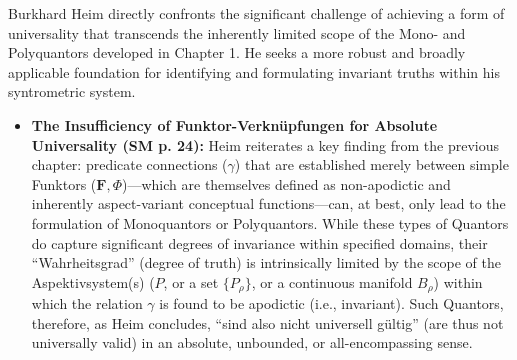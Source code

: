 \documentclass[12pt]{article}
\newcommand{\q}[1]{\enquote{#1}}
\newcommand{\aspektivsystem}{P}
\newcommand{\funktor}{\bm{F}}
\begin{document}
Burkhard Heim directly confronts the significant challenge of achieving a form of universality that transcends the inherently limited scope of the Mono- and Polyquantors developed in Chapter 1. He seeks a more robust and broadly applicable foundation for identifying and formulating invariant truths within his syntrometric system.

\begin{itemize}
    \item \textbf{The Insufficiency of Funktor-Verknüpfungen for Absolute Universality (SM p. 24):}
    Heim reiterates a key finding from the previous chapter: predicate connections (\(\gamma\)) that are established merely between simple Funktors (\(\funktor, \Phi\))—which are themselves defined as non-apodictic and inherently aspect-variant conceptual functions—can, at best, only lead to the formulation of Monoquantors or Polyquantors. While these types of Quantors do capture significant degrees of invariance within specified domains, their \q{Wahrheitsgrad} (degree of truth) is intrinsically limited by the scope of the Aspektivsystem(s) (\(\aspektivsystem\), or a set \(\{\aspektivsystem_\rho\}\), or a continuous manifold \(B_\rho\)) within which the relation \( \gamma \) is found to be apodictic (i.e., invariant). Such Quantors, therefore, as Heim concludes, \q{sind also nicht universell gültig} (are thus not universally valid) in an absolute, unbounded, or all-encompassing sense.


\end{itemize}
\end{document}
